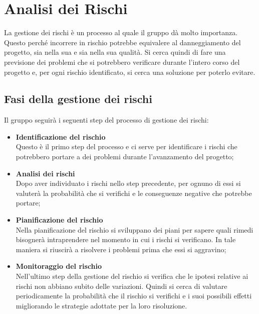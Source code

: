 \section{Analisi dei Rischi}
La gestione dei rischi è un processo al quale il gruppo \Gruppo{} dà molto importanza. Questo perché incorrere in rischio potrebbe equivalere al danneggiamento del progetto, sia nella sua  e sia nella sua qualità.
Si cerca quindi di fare una previsione dei problemi che si potrebbero verificare durante l'intero corso del progetto e, per ogni rischio identificato, si cerca una soluzione per poterlo evitare.

\subsection{Fasi della gestione dei rischi}
Il gruppo seguirà i seguenti step del processo di gestione dei rischi:
\begin{itemize}
	\item \textbf{Identificazione del rischio}
	\\ Questo è il primo step del processo e ci serve per identificare i rischi che potrebbero portare a dei problemi durante l'avanzamento del progetto; 
\end{itemize}
\begin{itemize}
	\item \textbf{Analisi dei rischi}
	\\ Dopo aver individuato i rischi nello step precedente, per ognuno di essi si valuterà la probabilità che si verifichi e le conseguenze negative che potrebbe portare;
\end{itemize}
\begin{itemize}
	\item \textbf{Pianificazione del rischio}
	\\ Nella pianificazione del rischio si sviluppano dei piani per sapere quali rimedi bisognerà intraprendere nel momento in cui i rischi si verificano. In tale maniera si riuscirà a risolvere i problemi prima che essi si aggravino;
\end{itemize}
\begin{itemize}
	\item \textbf{Monitoraggio del rischio} 
	\\ Nell'ultimo step della gestione del rischio si verifica che le ipotesi relative ai rischi non abbiano subito delle variazioni. Quindi si cerca di valutare periodicamente la probabilità che il rischio si verifichi e i suoi possibili effetti migliorando le strategie adottate per la loro risoluzione.
\end{itemize}

